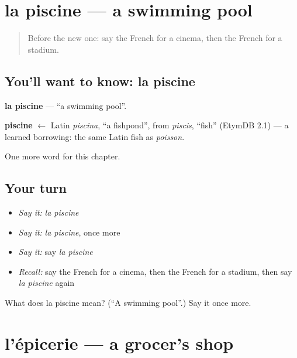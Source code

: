 \section[la piscine]{la piscine — a swimming pool}

\label{lesson:FR-C107-piscine}



\begin{quote}
Before the new one: say the French for a cinema, then the French for a stadium.
\end{quote}

\subsection*{You'll want to know: la piscine}
\textbf{la piscine} — \textquotedblleft{}a swimming pool\textquotedblright{}.

\begin{cousinweb}
\textbf{piscine} $\leftarrow$ Latin \emph{piscina}, \textquotedblleft{}a fishpond\textquotedblright{}, from \emph{piscis}, \textquotedblleft{}fish\textquotedblright{} (EtymDB 2.1) — a learned borrowing: the same Latin fish as \emph{poisson}.
\end{cousinweb}

\begin{grammarlens}[title={What you've built}]
One more word for this chapter.
\end{grammarlens}

\subsection*{Your turn}
\begin{itemize}
\raggedright
  \item \emph{Say it:} \emph{la piscine}
  \item \emph{Say it:} \emph{la piscine}, once more
  \item \emph{Say it:} say \emph{la piscine}
  \item \emph{Recall:} say the French for a cinema, then the French for a stadium, then say \emph{la piscine} again
\end{itemize}

\begin{tcolorbox}[breakable,colback=teal!4,colframe=teal!35!black,title={Before you move on}]
What does la piscine mean? (\textquotedblleft{}A swimming pool\textquotedblright{}.) Say it once more.
\end{tcolorbox}
\section[l'épicerie]{l'épicerie — a grocer's shop}

